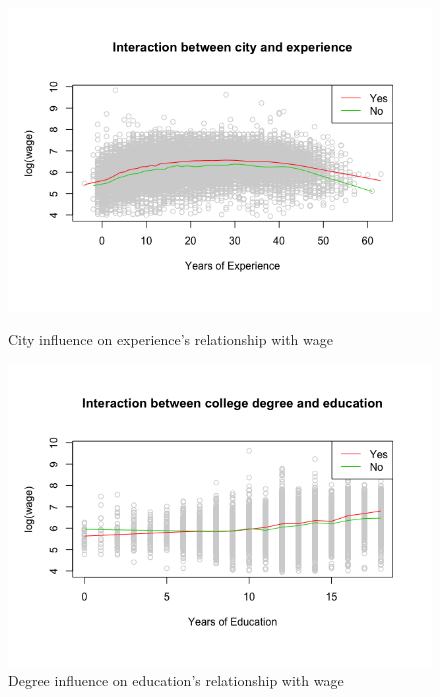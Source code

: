 \documentclass{article}
\begin{document}
\begin{figure}
\begin{minipage}{.45\textwidth}
          \includegraphics[scale=0.35]{interaction/cityexp}
          \caption{City influence on experience's relationship with wage}
          \label{fig:interactioncityexp}
        \end{minipage}
        \begin{minipage}{.45\textwidth}
          \centering
          \includegraphics[scale=0.35]{interaction/degedu}
          \caption{Degree influence on education's relationship with wage}
          \label{fig:interactiondegedu}


\end{minipage}
\end{figure}
\end{document}
